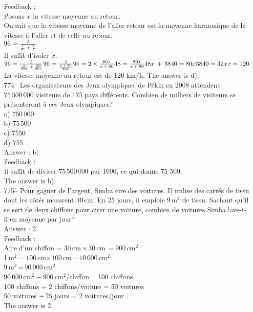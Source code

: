 ﻿\documentclass[letterpaper, 12pt]{article}
\begin{document}
Feedback : \\
Posons $x$ la vitesse moyenne au retour.\\
On sait que la vitesse moyenne de l'aller-retour est la moyenne harmonique
de la vitesse \`a l'aller et de celle au retour.  \\[2mm]
$96=\frac{2}{\frac{1}{80}\,+\,\frac{1}{x}}$\\[2mm]
Il suffit d'isoler $x$.\\[2mm]
$96=\frac{2}{\frac{x}{80x}\,+\,\frac{80}{80x}}\\[2mm]
96=\frac{2}{\frac{x\,+\,80}{80x}}\\[2mm]
96=2\times\frac{80x}{x\,+\,80}\\[2mm]
48=\frac{80x}{x\,+\,80}\\[2mm]
48x\,+\,3840=80x\\[2mm]
3840=32x\\[2mm]
x=120$\\[2mm]
La vitesse moyenne au retour est de 120 km/h.  The answer is d).\\

774-- Les organisateurs des Jeux olympiques de P\'ekin en 2008 attendent
$75\,500\,000$ visiteurs de 175 pays diff\'erents.  Combien de milliers de
visiteurs se pr\'esenteront \`a ces Jeux olympiques?\\
a) $750\,000$\\
b) $75\,500$\\
c) 7550\\
d) 755\\

Answer : b)\\

Feedback : \\
Il suffit de diviser  $75\,500\,000$ par 1000, ce qui donne 75 500.\\
The answer is b).\\

775-- Pour gagner de l'argent, Simba cire des voitures.  Il utilise des
carr\'es de tissu dont les c\^ot\'es mesurent 30\,cm.  En 25 jours, il
emploie 9\,m$^{2}$ de tissu.  Sachant qu'il se sert de deux chiffons pour
cirer une voiture, combien de voitures Simba lave-t-il en moyenne par
jour?\\

Answer : 2\\

Feedback : \\
Aire d'un chiffon = $30$\,cm\,$\times\,30$\,cm$\,=900$\,cm$^{2}$\\
1\,m$^{2}=100$\,cm$\times100$\,cm\,=\,$10\,000$\,cm$^{2}$\\
9\,m$^{2}$\,=\,$90\,000$\,cm$^{2}$\\
$90\,000$\,cm$^{2}\div900$\,cm$^{2}$/chiffon\,= 100 chiffons\\
100 chiffons $\div$ 2 chiffons/voiture  = 50 voitures\\
50 voitures $\div \,25 $ jours = 2 voitures/jour\\
The answer is 2.\\
\end{document}
